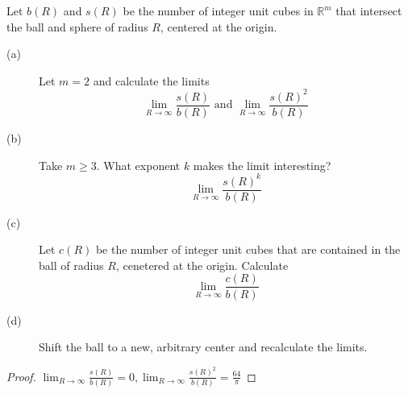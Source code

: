 \documentclass[11pt]{article}
\begin{document}
\begin{exercise}
    Let $b(R)$ and $s(R)$ be the number of integer unit cubes in $\mathbb{R}^m$ that intersect the ball and sphere of radius $R$, centered at the origin.
    \begin{description}
        \item[(a)] Let $m=2$ and calculate the limits
        \[\lim_{R \rightarrow \infty} \frac{s(R)}{b(R)} \text{ and } \lim_{R \rightarrow \infty} \frac{s(R)^2}{b(R)}\]
        \item[(b)] Take $m \geq 3$. What exponent $k$ makes the limit interesting?  
        \[\lim_{R \rightarrow \infty} \frac{s(R)^k}{b(R)}\]
        \item[(c)] Let $c(R)$ be the number of integer unit cubes that are contained in the ball of radius $R$, cenetered at the origin. Calculate
        \[\lim_{R \rightarrow \infty} \frac{c(R)}{b(R)} \] 
        \item[(d)] Shift the ball to a new, arbitrary center and recalculate the limits.      
    \end{description}
\end{exercise}
\begin{solution}
    \begin{proof}
        $\lim_{R \rightarrow \infty} \frac{s(R)}{b(R)}=0, \lim_{R \rightarrow \infty} \frac{s(R)^2}{b(R)} = \frac{64}{\pi} $
    \end{proof}
\end{solution}

\printsolutions
\end{document}
